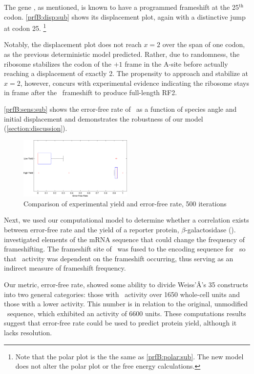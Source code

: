 \documentclass[12pt]{article}
\begin{document}
The gene \prfB, as mentioned, is known
to have a programmed frameshift at the 25$^{\textrm{th}}$ codon.
\autoref{prfB:disp:sub} shows its displacement plot,
again with a distinctive jump at codon 25.
\footnote{Note that the polar plot is the the same as \autoref{prfB:polar:sub}.
The new model does not alter the polar plot or the free energy calculations.}

Notably, the displacement plot does not reach $x=2$ over the span of
one codon, as the previous deterministic model predicted.  Rather, due to randomness, the
ribosome stabilizes the codon of the $+1$ frame in the A-site before actually reaching
a displacement of exactly 2.  The propensity to approach and stabilize at $x=2$,
however, concurs with experimental evidence indicating the ribosome
stays in frame after the \prfB\ frameshift to produce full-length RF2.
  
\autoref{prfB:sens:sub} shows the error-free rate of \prfB\ as a function
of species angle and initial displacement and demonstrates the
robustness of our model (\autoref{section:discussion}).

\begin{figure}
  \caption{Comparison of experimental yield and error-free rate, 500 iterations}
  \label{weissboxplot}
  \includegraphics[width=0.5\textwidth]{histograms/weissbox}
\end{figure}

Next, we used our computational model to determine whether a correlation exists between 
error-free rate and the yield of a reporter protein, $\beta$-galactosidase (\bgals).  
\citet{weiss87} investigated elements of the mRNA sequence that could change the frequency 
of frameshifting.  The frameshift site of \prfB\ was fused to the encoding sequence for 
\bgals\ so that \bgals\ activity was dependent on the frameshift occurring, 
thus serving as an indirect measure of frameshift frequency.  

Our metric, error-free rate, showed some ability to divide Weiss'Â’s 35 constructs into 
two general categories: those with \bgals\ activity over 1650 whole-cell units and those with a 
lower activity.  This number is in relation to the original, unmodified \prfB\ sequence, 
which exhibited an activity of 6600 units.  These computations results suggest that 
error-free rate could be used to predict protein yield, although it lacks resolution.
\end{document}
